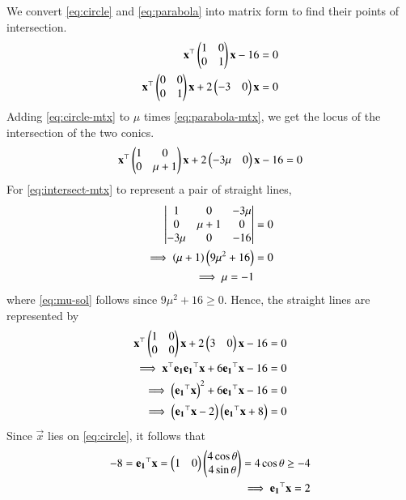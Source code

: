 \documentclass[journal,12pt,twocolumn]{IEEEtran}
\begin{document}
\begin{enumerate}
    \solution We convert \eqref{eq:circle} and \eqref{eq:parabola} into matrix
    form to find their points of intersection.
    \begin{align}
        \mathbf{x}^\top\begin{pmatrix}1&0\\0&1\end{pmatrix}\mathbf{x} - 16 &= 0 \label{eq:circle-mtx} \\
        \mathbf{x}^\top\begin{pmatrix}0&0\\0&1\end{pmatrix}\mathbf{x} + 2\begin{pmatrix}-3&0\end{pmatrix}\mathbf{x} &= 0 \label{eq:parabola-mtx}
    \end{align}
    Adding \eqref{eq:circle-mtx} to $\mu$ times \eqref{eq:parabola-mtx}, we get 
    the locus of the intersection of the two conics.
    \begin{align}
        \mathbf{x}^\top\begin{pmatrix}1&0\\0&\mu+1\end{pmatrix}\mathbf{x} + 2\begin{pmatrix}-3\mu&0\end{pmatrix}\mathbf{x} - 16 = 0
        \label{eq:intersect-mtx}
    \end{align}
    For \eqref{eq:intersect-mtx} to represent a pair of straight lines,
    \begin{align}
        \begin{vmatrix}1&0&-3\mu\\0&\mu+1&0\\-3\mu&0&-16\end{vmatrix} &= 0 \\
        \implies \left(\mu+1\right)\left(9\mu^2+16\right) &= 0 \\
        \implies \mu = -1 \label{eq:mu-sol}
    \end{align}
    where \eqref{eq:mu-sol} follows since $9\mu^2+16 \ge 0$.
    Hence, the straight lines are represented by
    \begin{align}
        \mathbf{x}^\top\begin{pmatrix}1&0\\0&0\end{pmatrix}\mathbf{x} + 2\begin{pmatrix}3&0\end{pmatrix}\mathbf{x} - 16 &= 0 \\
        \implies \mathbf{x}^\top\mathbf{e_1e_1}^\top\mathbf{x} + 6\mathbf{e_1}^\top\mathbf{x} - 16 &= 0 \\
        \implies \left(\mathbf{e_1}^\top\mathbf{x}\right)^2 + 6\mathbf{e_1}^\top\mathbf{x} - 16 &= 0 \\
        \implies \left(\mathbf{e_1}^\top\mathbf{x}-2\right)\left(\mathbf{e_1}^\top\mathbf{x}+8\right) &= 0
        \label{eq:st-line}
    \end{align}
    Since $\vec{x}$ lies on \eqref{eq:circle}, it follows that
    \begin{align}
        -8 = \mathbf{e_1}^\top\mathbf{x} = \begin{pmatrix}1&0\end{pmatrix}\begin{pmatrix}4\cos\theta\\4\sin\theta\end{pmatrix} = 4\cos\theta \ge -4 \\
        \implies \mathbf{e_1}^\top\mathbf{x} = 2 \label{eq:e1}
    \end{align}

\end{enumerate}
\end{document}
